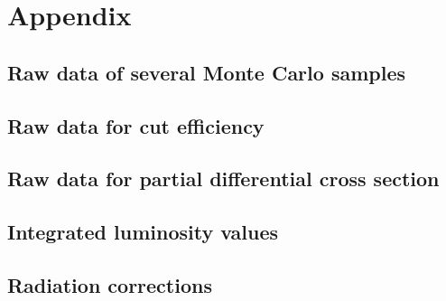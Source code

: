 \clearpage
\appendix
\section{Appendix}
\subsection{Raw data of several Monte Carlo samples}



	

\clearpage
\subsection{Raw data for cut efficiency}\label{app:59}


\clearpage
\subsection{Raw data for partial differential cross section}\label{app:510}


\subsection{Integrated luminosity values}


\subsection{Radiation corrections}

